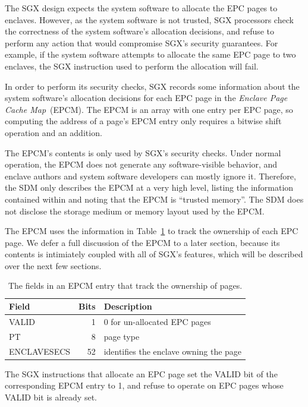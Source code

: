 The SGX design expects the system software to allocate the EPC pages to
enclaves. However, as the system software is not trusted, SGX processors check
the correctness of the system software's allocation decisions, and refuse to
perform any action that would compromise SGX's security guarantees. For
example, if the system software attempts to allocate the same EPC page to two
enclaves, the SGX instruction used to perform the allocation will fail.

In order to perform its security checks, SGX records some information about the
system software's allocation decisions for each EPC page in the
\textit{Enclave Page Cache Map}~(EPCM). The EPCM is an array with one entry
per EPC page, so computing the address of a page's EPCM entry only requires a
bitwise shift operation and an addition.

The EPCM's contents is only used by SGX's security checks. Under normal
operation, the EPCM does not generate any software-visible behavior, and
enclave authors and system software developers can mostly ignore it.
Therefore, the SDM only describes the EPCM at a very high level, listing the
information contained within and noting that the EPCM is ``trusted memory''.
The SDM does not disclose the storage medium or memory layout used by the EPCM.

The EPCM uses the information in Table~\ref{fig:sgx_epcm_ownership_fields} to
track the ownership of each EPC page. We defer a full discussion of the EPCM to
a later section, because its contents is intimiately coupled with all of SGX's
features, which will be described over the next few sections.

\begin{table}[hbt]
  \centering
  \begin{tabularx}{\columnwidth}{| l | r | X |}
  \hline
  \textbf{Field} & \textbf{Bits} & \textbf{Description}\\
  \hline
  VALID & 1 & 0 for un-allocated EPC pages \\
  \hline
  PT & 8 & page type \\
  \hline
  ENCLAVESECS & 52 & identifies the enclave owning the page \\
  \hline
  \end{tabularx}
  \caption{
    The fields in an EPCM entry that track the ownership of pages.
  }
  \label{fig:sgx_epcm_ownership_fields}
\end{table}

The SGX instructions that allocate an EPC page set the VALID bit of the
corresponding EPCM entry to 1, and refuse to operate on EPC pages whose VALID
bit is already set.

